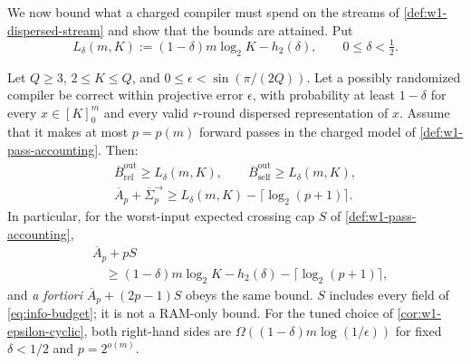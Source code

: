 We now bound what a charged compiler must spend on the streams of
\cref{def:w1-dispersed-stream} and show that the bounds are attained.  Put
\begin{equation}
 L_\delta(m,K):=(1-\delta)m\log_2K-h_2(\delta),
 \qquad 0\leq\delta<\tfrac12.
 \label{eq:w1-Ldelta}
\end{equation}

\begin{theorem}
\label{thm:w1-unified-frontier}
Let $Q\geq3$, $2\leq K\leq Q$, and
$0\leq\epsilon<\sin(\pi/(2Q))$.  Let a possibly randomized compiler be
correct within projective error $\epsilon$, with probability at least
$1-\delta$ for every $x\in[K]_0^m$ and every valid $r$-round dispersed
representation of $x$.  Assume that it makes at most $p=p(m)$ forward
passes in the charged model of \cref{def:w1-pass-accounting}.  Then:
\begin{gather}
 \overline B_{\mathrm{rel}}^{\mathrm{out}}\geq L_\delta(m,K),
 \qquad
 \overline B_{\mathrm{self}}^{\mathrm{out}}\geq L_\delta(m,K),
 \label{eq:w1-output-lower}\\
 \overline A_p+\overline\Sigma^{\to}_p
 \geq L_\delta(m,K)-\lceil\log_2(p+1)\rceil.
 \label{eq:w1-pass-lower}
\end{gather}
In particular, for the worst-input expected crossing cap $S$ of
\cref{def:w1-pass-accounting},
\begin{equation}
 \boxed{
 \begin{aligned}
 &\overline A_p+pS\\
 &\quad\geq(1-\delta)m\log_2K-h_2(\delta)-\lceil\log_2(p+1)\rceil,
 \end{aligned}}
 \label{eq:w1-frontier-box}
\end{equation}
and \emph{a fortiori} $\overline A_p+(2p-1)S$ obeys the same bound.
$S$ includes every field of \eqref{eq:info-budget}; it is not a RAM-only
bound.  For the tuned choice of \cref{cor:w1-epsilon-cyclic}, both right-hand sides
are $\Omega((1-\delta)m\log(1/\epsilon))$ for fixed
$\delta<1/2$ and $p=2^{o(m)}$.
\end{theorem}

